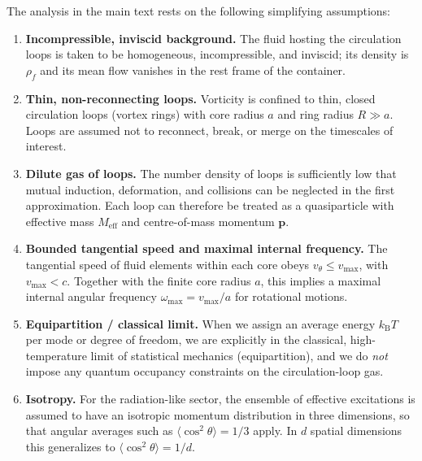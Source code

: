\documentclass[11pt]{article}
\begin{document}
                The analysis in the main text rests on the following simplifying assumptions:

                \begin{enumerate}
                    \item \textbf{Incompressible, inviscid background.}
                    The fluid hosting the circulation loops is taken to be homogeneous,
                    incompressible, and inviscid; its density is $\rho_f$ and its mean flow
                    vanishes in the rest frame of the container.

                    \item \textbf{Thin, non-reconnecting loops.}
                    Vorticity is confined to thin, closed circulation loops (vortex rings) with
                    core radius $a$ and ring radius $R \gg a$. Loops are assumed not to
                    reconnect, break, or merge on the timescales of interest.

                    \item \textbf{Dilute gas of loops.}
                    The number density of loops is sufficiently low that mutual induction,
                    deformation, and collisions can be neglected in the first approximation.
                    Each loop can therefore be treated as a quasiparticle with effective mass
                    $M_{\mathrm{eff}}$ and centre-of-mass momentum $\boldsymbol{p}$.

                    \item \textbf{Bounded tangential speed and maximal internal frequency.}
                    The tangential speed of fluid elements within each core obeys
                    $v_\theta \le v_{\max}$, with $v_{\max}<c$. Together with the finite core
                    radius $a$, this implies a maximal internal angular frequency
                    $\omega_{\max} = v_{\max}/a$ for rotational motions.

                    \item \textbf{Equipartition / classical limit.}
                    When we assign an average energy $k_{\mathrm B}T$ per mode or degree of
                    freedom, we are explicitly in the classical, high-temperature limit of
                    statistical mechanics (equipartition), and we do \emph{not} impose any
                    quantum occupancy constraints on the circulation-loop gas.

                    \item \textbf{Isotropy.}
                    For the radiation-like sector, the ensemble of effective excitations is
                    assumed to have an isotropic momentum distribution in three dimensions,
                    so that angular averages such as $\langle \cos^2\theta\rangle = 1/3$ apply.
                    In $d$ spatial dimensions this generalizes to
                    $\langle \cos^2\theta\rangle = 1/d$.
                \end{enumerate}
\end{document}
